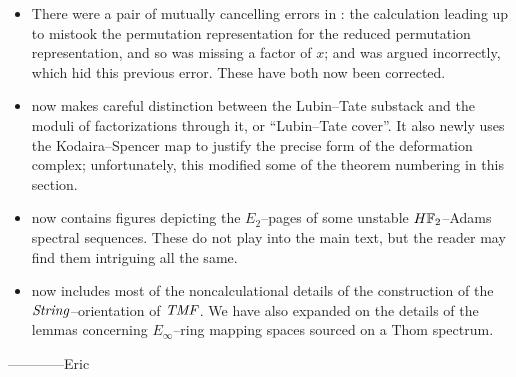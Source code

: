\begin{itemize}
    \item There were a pair of mutually cancelling errors in : the calculation leading up to  mistook the permutation representation for the reduced permutation representation, and so was missing a factor of \(x\); and  was argued incorrectly, which hid this previous error.  These have both now been corrected.
    \item {} now makes careful distinction between the Lubin--Tate substack and the moduli of factorizations through it, or ``Lubin--Tate cover''.  It also newly uses the Kodaira--Spencer map to justify the precise form of the deformation complex; unfortunately, this modified some of the theorem numbering in this section.
    \item {} now contains figures depicting the \(E_2\)--pages of some unstable \(\HFtwo\)--Adams spectral sequences.  These do not play into the main text, but the reader may find them intriguing all the same.
    \item {} now includes most of the noncalculational details of the construction of the \(\mathit{String}\)--orientation of \(\mathit{TMF}\).  We have also expanded on the details of the lemmas concerning \(E_\infty\)--ring mapping spaces sourced on a Thom spectrum.
\end{itemize}



\vspace{2\baselineskip}
\hspace{3em} ------------Eric




